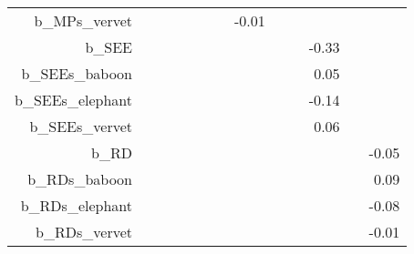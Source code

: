 \begin{table}[ht]
\begin{tabular}{rrrrrrrrrrrrr}
  b\_MPs\_vervet &  &  &  &  &  &  & -0.01 &  &  &  &  &  \\ 
  b\_SEE &  &  &  &  &  &  &  &  &  & -0.33 &  &  \\ 
  b\_SEEs\_baboon &  &  &  &  &  &  &  &  &  & 0.05 &  &  \\ 
  b\_SEEs\_elephant &  &  &  &  &  &  &  &  &  & -0.14 &  &  \\ 
  b\_SEEs\_vervet &  &  &  &  &  &  &  &  &  & 0.06 &  &  \\ 
  b\_RD &  &  &  &  &  &  &  &  &  &  &  & -0.05 \\ 
  b\_RDs\_baboon &  &  &  &  &  &  &  &  &  &  &  & 0.09 \\ 
  b\_RDs\_elephant &  &  &  &  &  &  &  &  &  &  &  & -0.08 \\ 
  b\_RDs\_vervet &  &  &  &  &  &  &  &  &  &  &  & -0.01 \\ 
   \hline
\end{tabular}
\end{table}
